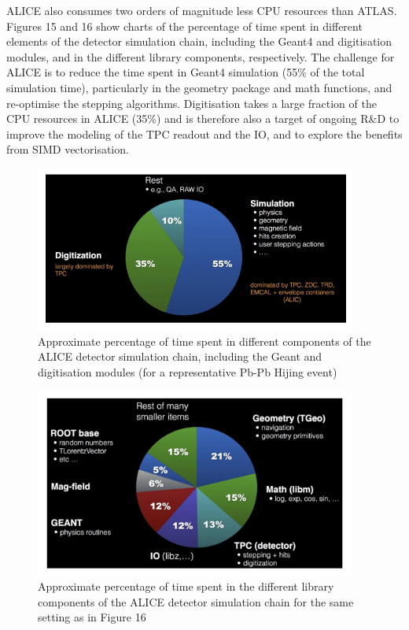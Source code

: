 \documentclass[12pt,a4paper]{article}
\begin{document}
{ALICE also consumes two orders of magnitude less CPU resources than
ATLAS. Figures 15 and 16 show charts of the percentage of time spent in
different elements of the detector simulation chain, including the
Geant4 and digitisation modules, and in the different library
components, respectively. The challenge for ALICE is to reduce the time
spent in Geant4 simulation (55\% of the total simulation time),
particularly in the geometry package and math functions, and re-optimise
the stepping algorithms. Digitisation takes a large fraction of the CPU
resources in ALICE (35\%) and is therefore also a target of ongoing R\&D
to improve the modeling of the TPC readout and the IO, and to explore
the benefits from SIMD vectorisation.

\begin{figure}[bthp]
\vspace*{0.3cm}
\centering
\includegraphics[width=0.94\textwidth]{image19.png}
\caption{Approximate percentage of time spent in different
components of the ALICE detector simulation chain, including the Geant
and digitisation modules (for a representative Pb-Pb Hijing event)}
\label{fig:alicecpu}
\end{figure}

\begin{figure}[bthp]
\vspace*{0.3cm}
\centering
\includegraphics[width=0.94\textwidth]{image20.png}
\caption{Approximate percentage of time spent in the different
library components of the ALICE detector simulation chain for the same
setting as in Figure 16}
\label{fig:alicesimchain}
\end{figure}

}
\end{document}
